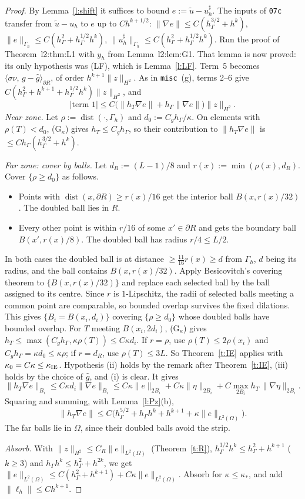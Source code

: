 \documentclass[11pt,reqno]{amsart}
\theoremstyle{plain}
\theoremstyle{definition}
\newcommand{\hG}{h_\Gamma}
\newcommand{\Gh}{\Gamma_h}
\newcommand{\ut}{\tilde u}
\newcommand{\ip}[2]{\langle #1,\, #2\rangle}
\newcommand{\norm}[1]{\lVert #1\rVert}
\DeclareMathOperator{\dist}{dist}
\begin{document}
\begin{proof}
By Lemma~\ref{l:shift} it suffices to bound $e:=\ut-u_h^\sharp$. The inputs of \texttt{07c} transfer from $\ut-u_h$ to $e$ up to $Ch^{k+1/2}$: $\norm{\nabla e}\le C(\hG^{3/2}+h^k)$, $\norm e_{\Gh}\le C(\hG^2+\hG^{1/2}h^k)$, $\norm{u_h^\sharp}_{\Gh}\le C(\hG^2+\hG^{1/2}h^k)$. Run the proof of Theorem~l2:thm:L1 with $y_h$ from Lemma~l2:lem:G1. That lemma is now proved: its only hypothesis was (LF), which is Lemma~\ref{l:LF}. Term~5 becomes $\ip{\sigma\nu}{g-\hat g}_{\partial R}$, of order $h^{k+1}\norm z_{H^2}$. As in \texttt{misc}~(g), terms 2--6 give $C(\hG^2+h^{k+1}+\hG^{1/2}h^k)\norm z_{H^2}$, and
\[
|\text{term 1}|\le C\bigl(\norm{h_T\nabla e}+\hG\norm{\nabla e}\bigr)\norm z_{H^2}.
\]
\emph{Near zone.} Let $\rho:=\dist(\cdot,\Gh)$ and $d_0:=C_g\hG/\kappa$. On elements with $\rho(T)<d_0$, (G$_\kappa$) gives $h_T\le C_g\hG$, so their contribution to $\norm{h_T\nabla e}$ is $\le C\hG(\hG^{3/2}+h^k)$.

\emph{Far zone: cover by balls.} Let $d_R:=(L-1)/8$ and $r(x):=\min(\rho(x),d_R)$. Cover $\{\rho\ge d_0\}$ as follows.
\begin{itemize}
\item Points with $\dist(x,\partial R)\ge r(x)/16$ get the interior ball $B(x,r(x)/32)$. The doubled ball lies in $R$.
\item Every other point is within $r/16$ of some $x'\in\partial R$ and gets the boundary ball $B(x',r(x)/8)$. The doubled ball has radius $r/4\le L/2$.
\end{itemize}
In both cases the doubled ball is at distance $\ge\frac{11}{16}r(x)\ge d$ from $\Gh$, $d$ being its radius, and the ball contains $B(x,r(x)/32)$. Apply Besicovitch's covering theorem to $\{B(x,r(x)/32)\}$ and replace each selected ball by the ball assigned to its centre. Since $r$ is $1$-Lipschitz, the radii of selected balls meeting a common point are comparable, so bounded overlap survives the fixed dilations. This gives $\{B_i=B(x_i,d_i)\}$ covering $\{\rho\ge d_0\}$ whose doubled balls have bounded overlap. For $T$ meeting $B(x_i,2d_i)$, (G$_\kappa$) gives $h_T\le\max(C_g\hG,\kappa\rho(T))\le C\kappa d_i$. If $r=\rho$, use $\rho(T)\le2\rho(x_i)$ and $C_g\hG=\kappa d_0\le\kappa\rho$; if $r=d_R$, use $\rho(T)\le3L$. So Theorem~\ref{t:IE} applies with $\kappa_0=C\kappa\le\kappa_{\rm IE}$. Hypothesis (ii) holds by the remark after Theorem~\ref{t:IE}, (iii) holds by the choice of $\hat g$, and (i) is clear. It gives
\[
\norm{h_T\nabla e}_{B_i}\le C\kappa d_i\norm{\nabla e}_{B_i}\le C\kappa\norm e_{2B_i}+C\kappa\norm\eta_{2B_i}+C\max_{2B_i}h_T\,\norm{\nabla\eta}_{2B_i}.
\]
Squaring and summing, with Lemma~\ref{l:Pz}(b),
\[
\norm{h_T\nabla e}\le C\bigl(\hG^{5/2}+\hG h^k+h^{k+1}+\kappa\norm e_{L^2(\Omega)}\bigr).
\]
The far balls lie in $\Omega$, since their doubled balls avoid the strip.

\emph{Absorb.} With $\norm z_{H^2}\le C_R\norm e_{L^2(\Omega)}$ (Theorem~\ref{t:R}), $\hG^{1/2}h^k\le\hG^2+h^{k+1}$ ($k\ge3$) and $\hG h^k\le\hG^2+h^{2k}$, we get $\norm e_{L^2(\Omega)}\le C(\hG^2+h^{k+1})+C\kappa\norm e_{L^2(\Omega)}$. Absorb for $\kappa\le\kappa_\ast$, and add $\norm{\ell_h}\le Ch^{k+1}$.
\end{proof}
\end{document}
